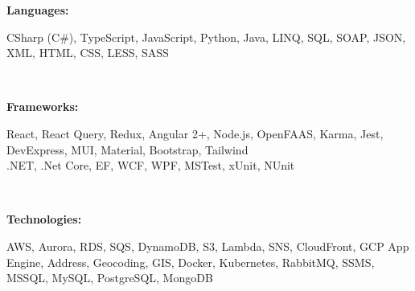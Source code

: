 \documentclass[9pt]{basecv} %
\begin{document}
\hfill %
\begin{minipage}[t]{0.57\textwidth}
    \begin{minipage}[t]{0.2\textwidth}
        \textbf{Languages:}
    \end{minipage}
    \hfill
    \begin{minipage}[t]{0.73\textwidth}
        CSharp (C\#), TypeScript, JavaScript, Python, Java, LINQ, SQL, SOAP, JSON, XML, HTML, CSS, LESS, SASS
    \end{minipage}
    \vspace{3.5mm}\\
    \begin{minipage}[t]{0.2\textwidth}
        \textbf{Frameworks:}
    \end{minipage}
    \hfill
    \begin{minipage}[t]{0.73\textwidth}
        React, React Query, Redux, Angular 2+, Node.js, OpenFAAS, Karma, Jest, DevExpress, MUI, Material, Bootstrap, Tailwind
        \\
        .NET, .Net Core, EF, WCF, WPF, MSTest, xUnit, NUnit
    \end{minipage}
    \vspace{3.5mm}\\
    \begin{minipage}[t]{0.21\textwidth}
        \textbf{Technologies:}
    \end{minipage}
    \hfill
    \begin{minipage}[t]{0.73\textwidth}
        AWS, Aurora, RDS, SQS, DynamoDB, S3, Lambda, SNS, CloudFront, GCP App Engine, Address, Geocoding, GIS,
        Docker, Kubernetes, RabbitMQ, SSMS, MSSQL, MySQL, PostgreSQL, MongoDB
    \end{minipage}
    {\vspace{2mm}}
\end{minipage}
{\vspace{-10pt}}
\end{document}
